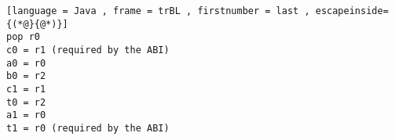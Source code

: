 \begin{lstlisting}[language = Java , frame = trBL , firstnumber = last , escapeinside={(*@}{@*)}]
pop r0
c0 = r1 (required by the ABI)
a0 = r0
b0 = r2
c1 = r1
t0 = r2
a1 = r0
t1 = r0 (required by the ABI)
\end{lstlisting}

